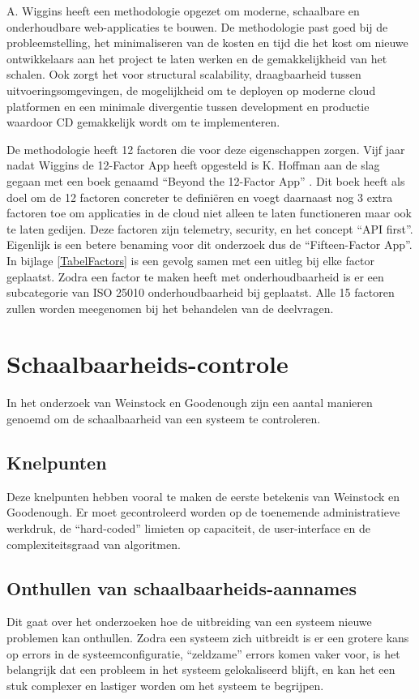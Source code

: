 A. Wiggins \parencite{12Factor} heeft een methodologie opgezet om moderne, schaalbare en onderhoudbare web-applicaties te bouwen. De methodologie past goed bij de probleemstelling, het minimaliseren van de kosten en tijd die het kost om nieuwe ontwikkelaars aan het project te laten werken en de gemakkelijkheid van het schalen. Ook zorgt het voor structural scalability, draagbaarheid tussen uitvoeringsomgevingen, de mogelijkheid om te deployen op moderne cloud platformen en een minimale divergentie tussen development en productie waardoor CD gemakkelijk wordt om te implementeren.

De methodologie heeft 12 factoren die voor deze eigenschappen zorgen. Vijf jaar nadat Wiggins de 12-Factor App heeft opgesteld is K. Hoffman aan de slag gegaan met een boek genaamd \enquote{Beyond the 12-Factor App} \parencite{Beyond12Factor}. Dit boek heeft als doel om de 12 factoren concreter te definiëren en voegt daarnaast nog 3 extra factoren toe om applicaties in de cloud niet alleen te laten functioneren maar ook te laten gedijen. Deze factoren zijn telemetry, security, en het concept \enquote{API first}. Eigenlijk is een betere benaming voor dit onderzoek dus de \enquote{Fifteen-Factor App}. In bijlage \ref{TabelFactors} is een gevolg samen met een uitleg bij elke factor geplaatst. Zodra een factor te maken heeft met onderhoudbaarheid is er een subcategorie van ISO 25010 onderhoudbaarheid bij geplaatst. Alle 15 factoren zullen worden meegenomen bij het behandelen van de deelvragen.

\section{Schaalbaarheids-controle}

In het onderzoek van Weinstock en Goodenough \parencite{OnSystemScalability} zijn een aantal manieren genoemd om de schaalbaarheid van een systeem te controleren.

\subsection{Knelpunten}
Deze knelpunten hebben vooral te maken de eerste betekenis van Weinstock en Goodenough. Er moet gecontroleerd worden op de toenemende administratieve werkdruk, de \enquote{hard-coded} limieten op capaciteit, de user-interface en de complexiteitsgraad van algoritmen.

\subsection{Onthullen van schaalbaarheids-aannames}
Dit gaat over het onderzoeken hoe de uitbreiding van een systeem nieuwe problemen kan onthullen. Zodra een systeem zich uitbreidt is er een grotere kans op errors in de systeemconfiguratie, \enquote{zeldzame} errors komen vaker voor, is het belangrijk dat een probleem in het systeem gelokaliseerd blijft, en kan het een stuk complexer en lastiger worden om het systeem te begrijpen.


